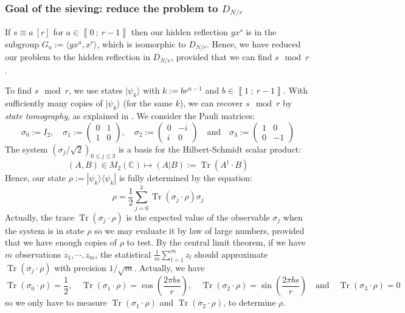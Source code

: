 \documentclass[a4paper,10pt]{report}
\theoremstyle{definition}
\theoremstyle{plain}
\theoremstyle{definition}
\newcommand{\C}{\mathbb{C}}
\renewcommand{\i}[2]{\left\llbracket #1~;~#2\right\rrbracket}
\renewcommand{\(}{\left(}
\renewcommand{\)}{\right)}
\DeclareMathOperator{\Tr}{Tr}
\begin{document}
\subsubsection{Goal of the sieving: reduce the problem to $D_{N/r}$}\label{paragraph 13}

If $s\equiv a \ [r]$ for $a\in\i{0}{r-1}$ then our hidden reflection $yx^s$ is in the subgroup $G_a:=\langle yx^a,x^r\rangle$, which is isomorphic to $D_{N/r}$. Hence, we have reduced our problem to the hidden reflection in $D_{N/r}$, provided that we can find $s \mod r$.

To find $s \mod r$, we use states $|\psi_k\rangle$ with $k:=br^{n-1}$ and $b\in\i{1}{r-1}$. With sufficiently many copies of $|\psi_k\rangle$ (for the same $k$), we can recover $s \mod r$ by \emph{state tomography}, as explained in \cite[§ 8.4.2, p.389]{NielsanChaung}. We consider the Pauli matrices:
\[\sigma_0:=I_2, \quad \sigma_1:=\(\begin{array}{cc}
0 & 1\\
1 & 0
\end{array}\), \quad \sigma_2:=\(\begin{array}{cc}
0 & -i\\
i & 0
\end{array}\) \quad \mbox{and} \quad \sigma_3:=\(\begin{array}{cc}
1 & 0\\
0 & -1
\end{array}\)\]
The system $(\sigma_j/\sqrt{2})_{0\leq j\leq 3}$ is a basis for the Hilbert-Schmidt scalar product:
\[(A,B)\in M_2(\C)\longmapsto (A|B):=\Tr(A^{\dag}\cdot B)\]
Hence, our state $\rho:=|\psi_k\rangle\langle\psi_k|$ is fully determined by the equation: 
\[\rho=\frac{1}{2}\sum_{j=0}^3\Tr(\sigma_j\cdot\rho)\sigma_j\]
Actually, the trace $\Tr(\sigma_j\cdot\rho)$ is the expected value of the observable $\sigma_j$ when the system is in state $\rho$ so we may evaluate it by law of large numbers,  provided that we have enough copies of $\rho$ to test. By the central limit theorem, if we have $m$ observations $z_1, \cdots, z_m$, the statistical $\frac{1}{m}\sum_{l=1}^m z_l$ should approximate $\Tr(\sigma_j\cdot\rho)$ with precision $1/\sqrt{m}$.  Actually, we have
\[\Tr(\sigma_0\cdot\rho)=\frac{1}{2}, \quad \Tr(\sigma_1\cdot\rho)=\cos\(\frac{2\pi bs}{r}\), \quad \Tr(\sigma_2\cdot\rho)=\sin\(\frac{2\pi bs}{r}\) \quad \mbox{and} \quad \Tr(\sigma_3\cdot\rho)=0\]
so we only have to measure $\Tr(\sigma_1\cdot\rho)$ and $\Tr(\sigma_2\cdot\rho)$, to determine $\rho$.
\end{document}

